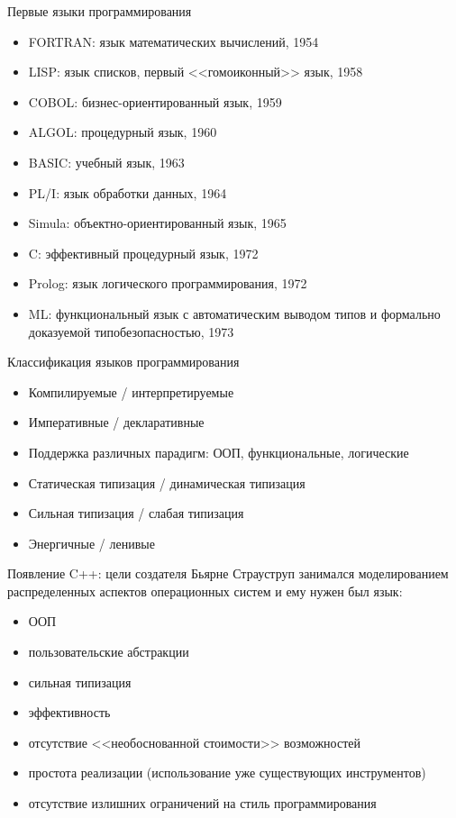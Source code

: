 \documentclass{beamer}
\begin{document}
\begin{frame}[fragile]{Первые языки программирования}
Ассемблер\\
Assembler}]{history/foo.asm}
\end{frame}

\begin{frame}{Первые языки программирования}
\begin{itemize}
  \item FORTRAN: язык математических вычислений, 1954
  \item LISP: язык списков, первый <<гомоиконный>> язык, 1958
  \item COBOL: бизнес-ориентированный язык, 1959
  \item ALGOL: процедурный язык, 1960
  \item BASIC: учебный язык, 1963
  \item PL/I: язык обработки данных, 1964
  \item Simula: объектно-ориентированный язык, 1965
  \item C: эффективный процедурный язык, 1972
  \item Prolog: язык логического программирования, 1972
  \item ML: функциональный язык с автоматическим выводом типов и формально доказуемой типобезопасностью, 1973
\end{itemize}
\end{frame}

\begin{frame}{Классификация языков программирования}
\begin{itemize}
  \item Компилируемые / интерпретируемые
  \item Императивные / декларативные
  \item Поддержка различных парадигм: ООП, функциональные, логические
  \item Статическая типизация / динамическая типизация
  \item Сильная типизация / слабая типизация
  \item Энергичные / ленивые
\end{itemize}
\end{frame}

\begin{frame}{Появление C++: цели создателя}
Бьярне Страуструп занимался моделированием распределенных аспектов операционных систем и ему нужен был язык:
\begin{itemize}
  \item ООП
  \item пользовательские абстракции
  \item сильная типизация
  \item эффективность
  \item отсутствие <<необоснованной стоимости>> возможностей
  \item простота реализации (использование уже существующих инструментов)
  \item отсутствие излишних ограничений на стиль программирования
\end{itemize}
\end{frame}
\end{document}
